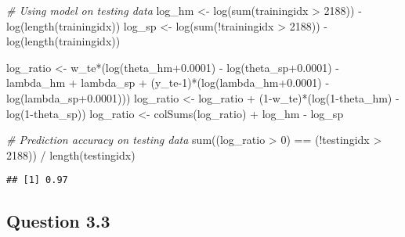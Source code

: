 \documentclass[
]{article}
\newenvironment{Shaded}{\begin{snugshade}}{\end{snugshade}}
\newcommand{\CommentTok}[1]{\textcolor[rgb]{0.56,0.35,0.01}{\textit{#1}}}
\newcommand{\DecValTok}[1]{\textcolor[rgb]{0.00,0.00,0.81}{#1}}
\newcommand{\FloatTok}[1]{\textcolor[rgb]{0.00,0.00,0.81}{#1}}
\newcommand{\FunctionTok}[1]{\textcolor[rgb]{0.00,0.00,0.00}{#1}}
\newcommand{\NormalTok}[1]{#1}
\newcommand{\OtherTok}[1]{\textcolor[rgb]{0.56,0.35,0.01}{#1}}
\newcommand{\SpecialCharTok}[1]{\textcolor[rgb]{0.00,0.00,0.00}{#1}}
\begin{document}
\begin{Shaded}
\begin{Highlighting}[]
\CommentTok{\# Using model on testing data}
\NormalTok{log\_hm }\OtherTok{\textless{}{-}} \FunctionTok{log}\NormalTok{(}\FunctionTok{sum}\NormalTok{(trainingidx }\SpecialCharTok{\textgreater{}} \DecValTok{2188}\NormalTok{)) }\SpecialCharTok{{-}} \FunctionTok{log}\NormalTok{(}\FunctionTok{length}\NormalTok{(trainingidx))}
\NormalTok{log\_sp }\OtherTok{\textless{}{-}} \FunctionTok{log}\NormalTok{(}\FunctionTok{sum}\NormalTok{(}\SpecialCharTok{!}\NormalTok{trainingidx }\SpecialCharTok{\textgreater{}} \DecValTok{2188}\NormalTok{)) }\SpecialCharTok{{-}} \FunctionTok{log}\NormalTok{(}\FunctionTok{length}\NormalTok{(trainingidx))}

\NormalTok{log\_ratio }\OtherTok{\textless{}{-}}\NormalTok{ w\_te}\SpecialCharTok{*}\NormalTok{(}\FunctionTok{log}\NormalTok{(theta\_hm}\FloatTok{+0.0001}\NormalTok{) }\SpecialCharTok{{-}} \FunctionTok{log}\NormalTok{(theta\_sp}\FloatTok{+0.0001}\NormalTok{) }\SpecialCharTok{{-}}\NormalTok{ lambda\_hm }\SpecialCharTok{+}\NormalTok{ lambda\_sp }
                   \SpecialCharTok{+}\NormalTok{ (y\_te}\DecValTok{{-}1}\NormalTok{)}\SpecialCharTok{*}\NormalTok{(}\FunctionTok{log}\NormalTok{(lambda\_hm}\FloatTok{+0.0001}\NormalTok{) }\SpecialCharTok{{-}} \FunctionTok{log}\NormalTok{(lambda\_sp}\FloatTok{+0.0001}\NormalTok{)))}
\NormalTok{log\_ratio }\OtherTok{\textless{}{-}}\NormalTok{ log\_ratio }\SpecialCharTok{+}\NormalTok{ (}\DecValTok{1}\SpecialCharTok{{-}}\NormalTok{w\_te)}\SpecialCharTok{*}\NormalTok{(}\FunctionTok{log}\NormalTok{(}\DecValTok{1}\SpecialCharTok{{-}}\NormalTok{theta\_hm) }\SpecialCharTok{{-}} \FunctionTok{log}\NormalTok{(}\DecValTok{1}\SpecialCharTok{{-}}\NormalTok{theta\_sp))}
\NormalTok{log\_ratio }\OtherTok{\textless{}{-}} \FunctionTok{colSums}\NormalTok{(log\_ratio) }\SpecialCharTok{+}\NormalTok{ log\_hm }\SpecialCharTok{{-}}\NormalTok{ log\_sp}

\CommentTok{\# Prediction accuracy on testing data}
\FunctionTok{sum}\NormalTok{((log\_ratio }\SpecialCharTok{\textgreater{}} \DecValTok{0}\NormalTok{) }\SpecialCharTok{==}\NormalTok{ (}\SpecialCharTok{!}\NormalTok{testingidx }\SpecialCharTok{\textgreater{}} \DecValTok{2188}\NormalTok{)) }\SpecialCharTok{/} \FunctionTok{length}\NormalTok{(testingidx)}
\end{Highlighting}
\end{Shaded}

\begin{verbatim}
## [1] 0.97
\end{verbatim}

\hypertarget{question-3.3}{%
\subsection{Question 3.3}\label{question-3.3}}
\end{document}
